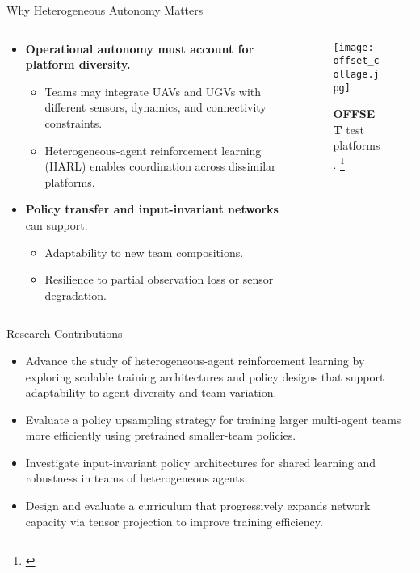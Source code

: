 \documentclass[xcolor={svgnames},aspectratio=169]{beamer}
\begin{document}
\begin{frame}{Why Heterogeneous Autonomy Matters}
\begin{columns}
    \begin{column}{0.6\textwidth}
    \begin{itemize}
        \item \textbf{Operational autonomy must account for platform diversity.}
        \begin{itemize}
            \item Teams may integrate UAVs and UGVs with different sensors, dynamics, and connectivity constraints.
            \item Heterogeneous-agent reinforcement learning (HARL) enables coordination across dissimilar platforms.
        \end{itemize}
        \item \textbf{Policy transfer and input-invariant networks} can support:
        \begin{itemize}
            \item Adaptability to new team compositions.
            \item Resilience to partial observation loss or sensor degradation.
        \end{itemize}
    \end{itemize}
    \end{column}
    \begin{column}{0.4\textwidth}
        \begin{figure}[!h]
            \centering
            \texttt{[image: offset\_collage.jpg]}
            \caption{\textbf{OFFSET} test platforms.
                \footnote[frame]{\cite{zotero-2835}}}
            \label{fig:offset_collage}
        \end{figure}
    \end{column}
\end{columns}
\end{frame}

\begin{frame}{Research Contributions}
    \begin{itemize}
        \item {%
            Advance the study of heterogeneous-agent reinforcement learning by exploring 
            scalable training architectures and policy designs that support adaptability 
            to agent diversity and team variation.}
        \item {%
            Evaluate a policy upsampling strategy for training larger multi-agent teams 
            more efficiently using pretrained smaller-team policies.}
        \item {%
            Investigate input-invariant policy architectures for shared learning and 
            robustness in teams of heterogeneous agents.}
        \item {%
            Design and evaluate a curriculum that progressively expands network capacity 
            via tensor projection to improve training efficiency.}
    \end{itemize}
\end{frame}
\end{document}
